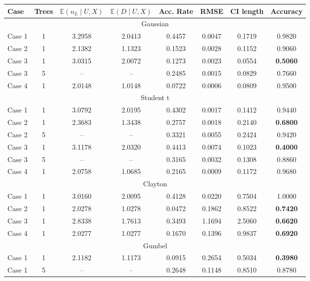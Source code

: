 \documentclass{amsart}
\begin{document}
\begin{table}[ht]
	\centering
	\scriptsize{
	\begin{tabular}{lc|cccccc}
		\toprule
		Case & Trees & $\mathbb{E}(n_L\mid U,X)$ & $\mathbb{E}(D\mid U,X)$ & Acc. Rate & RMSE & CI length & Accuracy \\ 
		\midrule
		\multicolumn{8}{c}{Gaussian} \\
		\midrule
		Case 1 & 1 & 3.2958 & 2.0413 & 0.4457 & 0.0047 & 0.1719 & 0.9820 \\ 
		Case 2 & 1 & 2.1382 & 1.1323 & 0.1523 & 0.0028 & 0.1152 & 0.9060 \\ 
		Case 3 & 1 & 3.0315 & 2.0072 & 0.1273 & 0.0023 & 0.0554 & \textbf{0.5060} \\
		Case 3 & 5 & -- & -- & 0.2485 & 0.0015 & 0.0829 & 0.7660 \\ 
		Case 4 & 1 & 2.0148 & 1.0148 & 0.0722 & 0.0006 & 0.0809 & 0.9500 \\ 
		\midrule
		\multicolumn{8}{c}{Student t} \\
		\midrule
		Case 1 & 1 & 3.0792 & 2.0195 & 0.4302 & 0.0017 & 0.1412 & 0.9440 \\ 
		Case 2 & 1 & 2.3683 & 1.3438 & 0.2757 & 0.0018 & 0.2140 & \textbf{0.6800} \\ 
		Case 2 & 5 & -- & -- & 0.3321 & 0.0055 & 0.2424 & 0.9420 \\
		Case 3 & 1 & 3.1178 & 2.0320 & 0.4413 & 0.0074 & 0.1023 & \textbf{0.4000} \\ 
		Case 3 & 5 & -- & -- & 0.3165 & 0.0032 & 0.1308 & 0.8860 \\
		Case 4 & 1 & 2.0758 & 1.0685 & 0.2165 & 0.0009 & 0.1172 & 0.9680 \\ 
		\midrule
		\multicolumn{8}{c}{Clayton} \\
		\midrule
		Case 1 & 1 & 3.0160 & 2.0095 & 0.4128 & 0.0220 & 0.7504 & 1.0000 \\ 
		Case 2 & 1 & 2.0278 & 1.0278 & 0.0472 & 0.1862 & 0.8522 & \textbf{0.7420} \\ 
		Case 3 & 1 & 2.8338 & 1.7613 & 0.3493 & 1.1694 & 2.5060 & \textbf{0.6620} \\ 
		Case 4 & 1 & 2.0277 & 1.0277 & 0.1670 & 0.1396 & 0.9837 & \textbf{0.6920} \\
		\midrule
		\multicolumn{8}{c}{Gumbel} \\
		\midrule
		Case 1 & 1 & 2.1182 & 1.1173 & 0.0915 & 0.2654 & 0.5034 & \textbf{0.3980} \\ 
		Case 1 & 5 & -- & -- & 0.2648 & 0.1148 & 0.8510 & 0.8780 \\

\end{tabular}}
\end{table}
\end{document}
